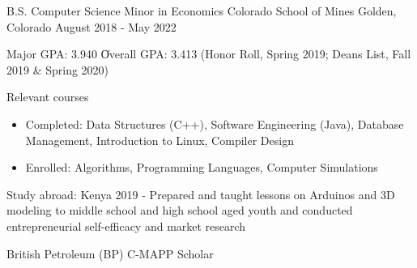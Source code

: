 \vspace{-2.0mm}


\begin{cventries}

  \cventry
    {B.S. Computer Science \newline \vspace{-1mm} Minor in Economics}
    {Colorado School of Mines} %
    {Golden, Colorado} %
    {August 2018 - May 2022} %
    {
      \begin{cvitems} %
        \item {Major GPA: 3.940 \| Overall GPA: 3.413 (Honor Roll, Spring 2019; Deans
    List, Fall 2019 \& Spring 2020)}
        \item {Relevant courses}
        \begin {itemize}
               \item {Completed: Data Structures (C++), Software
    Engineering (Java), Database Management, Introduction to Linux, Compiler Design}
        \item {Enrolled: Algorithms, Programming Languages, Computer Simulations }
       \end {itemize}
\item {Study abroad: Kenya 2019 - Prepared and taught lessons on Arduinos and 3D modeling to
middle school and high school aged youth and conducted entrepreneurial self-efficacy and market research }
\item {British Petroleum (BP) C-MAPP Scholar}
      \end{cvitems}
    }
    



\end{cventries}

